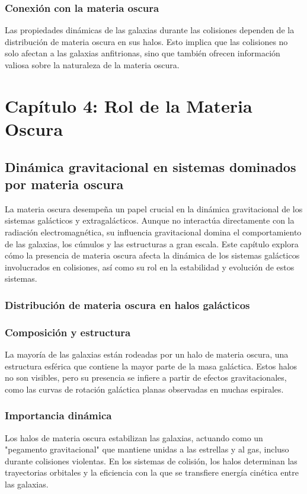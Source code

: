 \documentclass{article}
\begin{document}
\subsubsection{Conexión con la materia oscura}

Las propiedades dinámicas de las galaxias durante las colisiones dependen de la distribución de materia oscura en sus halos.
Esto implica que las colisiones no solo afectan a las galaxias anfitrionas, sino que también ofrecen información valiosa sobre la naturaleza de la materia oscura.

\section{Capítulo 4: Rol de la Materia Oscura}
\subsection{Dinámica gravitacional en sistemas dominados por materia oscura}
La materia oscura desempeña un papel crucial en la dinámica gravitacional de los sistemas galácticos y extragalácticos. Aunque no interactúa directamente con la radiación electromagnética, su influencia gravitacional domina el comportamiento de las galaxias, los cúmulos y las estructuras a gran escala. Este capítulo explora cómo la presencia de materia oscura afecta la dinámica de los sistemas galácticos involucrados en colisiones, así como su rol en la estabilidad y evolución de estos sistemas.

\subsubsection{Distribución de materia oscura en halos galácticos}
\subsubsection*{Composición y estructura}

La mayoría de las galaxias están rodeadas por un halo de materia oscura, una estructura esférica que contiene la mayor parte de la masa galáctica. Estos halos no son visibles, pero su presencia se infiere a partir de efectos gravitacionales, como las curvas de rotación galáctica planas observadas en muchas espirales.
\subsubsection*{Importancia dinámica}

Los halos de materia oscura estabilizan las galaxias, actuando como un "pegamento gravitacional" que mantiene unidas a las estrellas y al gas, incluso durante colisiones violentas. En los sistemas de colisión, los halos determinan las trayectorias orbitales y la eficiencia con la que se transfiere energía cinética entre las galaxias.
\end{document}
